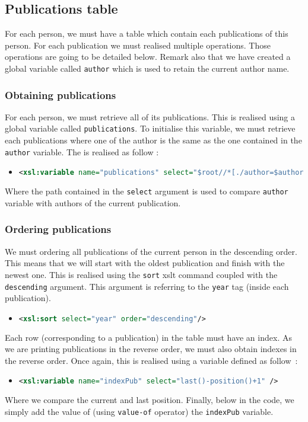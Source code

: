 \documentclass{article}
\begin{document}
  \subsection{Publications table}
    For each person, we must have a table which contain each publications of this person. For each publication we must realised multiple operations. Those operations are going to be detailed below. Remark also that we have created a global variable called \verb|author| which is used to retain the current author name.

    \subsubsection{Obtaining publications}
      For each person, we must retrieve all of its publications. This is realised using a global variable called \verb|publications|. To initialise this variable, we must retrieve each publications where one of the author is the same as the one contained in the \verb|author| variable. The is realised as follow :
      \begin{itemize}
	\item \begin{lstlisting}[language=XML]
<xsl:variable name="publications" select="$root//*[./author=$author]" />\end{lstlisting}
      \end{itemize}
      Where the path contained in the \verb|select| argument is used to compare \verb|author| variable with authors of the current publication.
      
    \subsubsection{Ordering publications}
      We must ordering all publications of the current person in the descending order. This means that we will start with the oldest publication and finish with the newest one. This is realised using the \verb|sort| xslt command coupled with the \verb|descending| argument. This argument is referring to the \verb|year| tag (inside each publication).
      \begin{itemize}
	\item \begin{lstlisting}[language=XML]
<xsl:sort select="year" order="descending"/>\end{lstlisting}
      \end{itemize}
      Each row (corresponding to a publication) in the table must have an index. As we are printing publications in the reverse order, we must also obtain indexes in the reverse order. Once again, this is realised using a variable defined as follow~:
      \begin{itemize}
	\item \begin{lstlisting}[language=XML]
<xsl:variable name="indexPub" select="last()-position()+1" />\end{lstlisting}
      \end{itemize}
      Where we compare the current and last position. Finally, below in the code, we simply add the value of (using \verb|value-of| operator) the \verb|indexPub| variable. 
      
\end{document}
